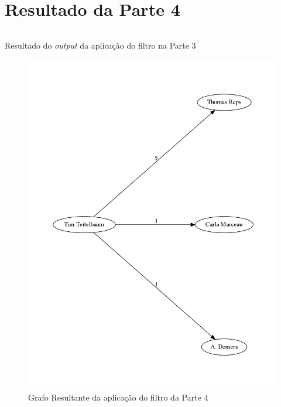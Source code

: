 \chapter{Resultado da Parte 4}
\label{appendix:d1}
\begin{longlisting}
	\inputminted{tex}{testes/res_dot.dot}
	\caption{Resultado do \emph{output} da aplicação do filtro na Parte 3}

	\label{listing:d1}
\end{longlisting}
\newpage

\begin{figure}[hbtp]
	\centering
  \includegraphics[scale=0.5]{testes/out.png}
	\caption{Grafo Resultante da aplicação do filtro da Parte 4}
	\label{fig:d1}
\end{figure}









